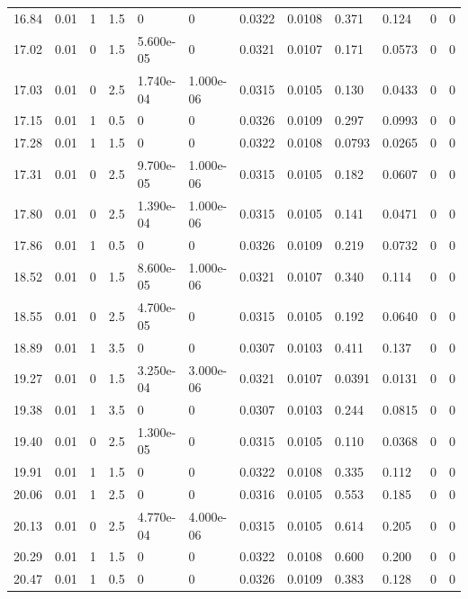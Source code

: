 \documentclass[preview]{standalone}
\begin{document}
{{{\begin{tabular}{L{1.2cm}C{1.2cm} C{0.3cm}C{0.5cm} C{1.4cm}C{1.4cm} C{1.4cm}C{1.4cm} C{1.6cm}C{1.6cm} C{1.6cm}C{1.6cm}}
  16.84  &  0.01  & 1     & 1.5 &  0  & 0  &  0.0322&   0.0108& 0.371 & 0.124   &  0 & 0  \\ 
  17.02  &  0.01  & 0     & 1.5 &  5.600e-05  & 0  &  0.0321&   0.0107& 0.171 & 0.0573   &  0 & 0  \\ 
  17.03  &  0.01  & 0     & 2.5 &  1.740e-04  & 1.000e-06  &  0.0315&   0.0105& 0.130 & 0.0433   &  0 & 0  \\ 
  17.15  &  0.01  & 1     & 0.5 &  0  & 0  &  0.0326&   0.0109& 0.297 & 0.0993   &  0 & 0  \\ 
  17.28  &  0.01  & 1     & 1.5 &  0  & 0  &  0.0322&   0.0108& 0.0793 & 0.0265   &  0 & 0  \\ 
  17.31  &  0.01  & 0     & 2.5 &  9.700e-05  & 1.000e-06  &  0.0315&   0.0105& 0.182 & 0.0607   &  0 & 0  \\ 
  17.80  &  0.01  & 0     & 2.5 &  1.390e-04  & 1.000e-06  &  0.0315&   0.0105& 0.141 & 0.0471   &  0 & 0  \\ 
  17.86  &  0.01  & 1     & 0.5 &  0  & 0  &  0.0326&   0.0109& 0.219 & 0.0732   &  0 & 0  \\ 
  18.52  &  0.01  & 0     & 1.5 &  8.600e-05  & 1.000e-06  &  0.0321&   0.0107& 0.340 & 0.114   &  0 & 0  \\ 
  18.55  &  0.01  & 0     & 2.5 &  4.700e-05  & 0  &  0.0315&   0.0105& 0.192 & 0.0640   &  0 & 0  \\ 
  18.89  &  0.01  & 1     & 3.5 &  0  & 0  &  0.0307&   0.0103& 0.411 & 0.137   &  0 & 0  \\ 
  19.27  &  0.01  & 0     & 1.5 &  3.250e-04  & 3.000e-06  &  0.0321&   0.0107& 0.0391 & 0.0131   &  0 & 0  \\ 
  19.38  &  0.01  & 1     & 3.5 &  0  & 0  &  0.0307&   0.0103& 0.244 & 0.0815   &  0 & 0  \\ 
  19.40  &  0.01  & 0     & 2.5 &  1.300e-05  & 0  &  0.0315&   0.0105& 0.110 & 0.0368   &  0 & 0  \\ 
  19.91  &  0.01  & 1     & 1.5 &  0  & 0  &  0.0322&   0.0108& 0.335 & 0.112   &  0 & 0  \\ 
  20.06  &  0.01  & 1     & 2.5 &  0  & 0  &  0.0316&   0.0105& 0.553 & 0.185   &  0 & 0  \\ 
  20.13  &  0.01  & 0     & 2.5 &  4.770e-04  & 4.000e-06  &  0.0315&   0.0105& 0.614 & 0.205   &  0 & 0  \\ 
  20.29  &  0.01  & 1     & 1.5 &  0  & 0  &  0.0322&   0.0108& 0.600 & 0.200   &  0 & 0  \\ 
  20.47  &  0.01  & 1     & 0.5 &  0  & 0  &  0.0326&   0.0109& 0.383 & 0.128   &  0 & 0  \\ 

\end{tabular}}}}
\end{document}
